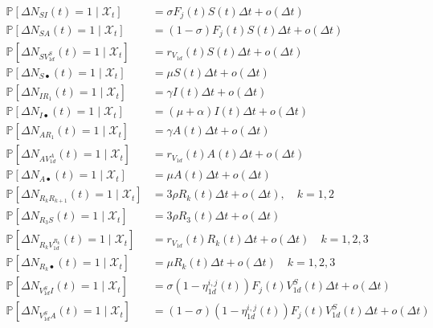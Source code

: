 \begin{fullwidth}
\begingroup
\allowdisplaybreaks
\label{eq:stochsys}
\begin{align}
    \mathbb{P}\left[ \Delta N_{SI}(t) = 1 \mid\mathcal{X}_t\right] &= \sigma F_j(t) S(t) \Delta t + o(\Delta t)\\ \label{eq:stochstart}
    \mathbb{P}\left[ \Delta N_{SA}(t) = 1 \mid\mathcal{X}_t\right] &= (1-\sigma) F_j(t) S(t) \Delta t + o(\Delta t)\\
    \mathbb{P}\left[ \Delta N_{SV_{1d}^S}(t) = 1 \mid\mathcal{X}_t\right] &= r_{V_{1d}}(t) S(t) \Delta t + o(\Delta t)\\
    \mathbb{P}\left[ \Delta N_{S\bullet}(t) = 1 \mid\mathcal{X}_t\right] &= \mu  S(t) \Delta t + o(\Delta t)\\
    \mathbb{P}\left[ \Delta N_{IR_1}(t) = 1 \mid\mathcal{X}_t\right] &= \gamma I(t) \Delta t + o(\Delta t)\\
    \mathbb{P}\left[ \Delta N_{I\bullet}(t) = 1 \mid\mathcal{X}_t\right] &= (\mu+\alpha)I(t) \Delta t + o(\Delta t)\\
    \mathbb{P}\left[ \Delta N_{AR_1}(t) = 1 \mid\mathcal{X}_t\right] &= \gamma A(t) \Delta t + o(\Delta t)\\
      \mathbb{P}\left[ \Delta N_{AV_{1d}^A}(t) = 1 \mid\mathcal{X}_t\right] &= r_{V_{1d}}(t) A(t) \Delta t + o(\Delta t)\\
      \mathbb{P}\left[ \Delta N_{A\bullet}(t) = 1 \mid\mathcal{X}_t\right] &= \mu  A(t) \Delta t + o(\Delta t)\\
    \mathbb{P}\left[ \Delta N_{R_kR_{k+1}}(t) = 1 \mid\mathcal{X}_t\right] &= 3\rho R_k(t) \Delta t + o(\Delta t),\quad k=1,2\\
    \mathbb{P}\left[ \Delta N_{R_3S}(t) = 1 \mid\mathcal{X}_t\right] &= 3\rho R_3(t) \Delta t + o(\Delta t)\\
    \mathbb{P}\left[ \Delta N_{R_kV_{1d}^{R_k}}(t) = 1 \mid\mathcal{X}_t\right] &= r_{V_{1d}}(t) R_k(t) \Delta t + o(\Delta t)\quad k=1,2,3\\
    \mathbb{P}\left[ \Delta N_{R_k\bullet}(t) = 1 \mid\mathcal{X}_t\right] &= \mu  R_k(t) \Delta t + o(\Delta t)\quad k=1,2,3\\
    \mathbb{P}\left[ \Delta N_{V_{1d}^SI}(t) = 1 \mid\mathcal{X}_t\right] &=  \sigma (1-\eta_{1d}^{i,j}(t)) F_j(t) V_{1d}^S(t) \Delta t + o(\Delta t)\\
    \mathbb{P}\left[ \Delta N_{V_{1d}^SA}(t) = 1 \mid\mathcal{X}_t\right] &=  (1-\sigma) (1-\eta_{1d}^{i,j}(t)) F_j(t) V_{1d}^S(t) \Delta t + o(\Delta t)\\

\end{align}
\end{fullwidth}
